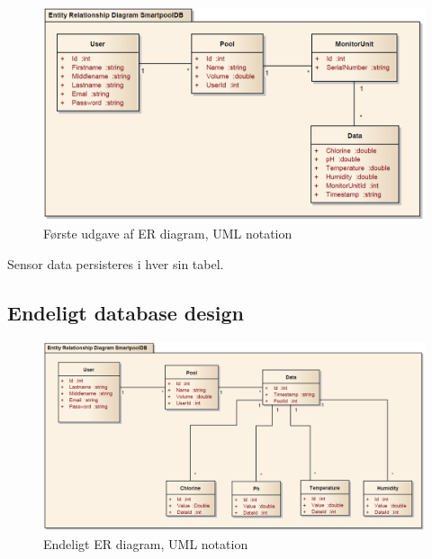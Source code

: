 \begin{figure}
	\centering
	\includegraphics[width=\linewidth]{figs/design/databaseERD_old_uml}
	\caption{Første udgave af ER diagram, UML notation}
	\label{fig:databaseERD_old_uml}
\end{figure}

Sensor data persisteres i hver sin tabel.

\subsection{Endeligt database design}

\begin{figure}
\centering
\includegraphics[width=\linewidth]{figs/design/databaseERD_final_uml}
\caption{Endeligt ER diagram, UML notation}
\label{fig:databaseERD_final_uml}
\end{figure}




